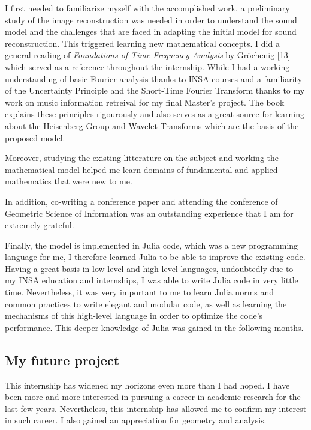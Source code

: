 \documentclass[american,]{article}
\theoremstyle{definition}
\theoremstyle{definition}
\theoremstyle{definition}
\theoremstyle{remark}
\begin{document}
I first needed to familiarize myself with the accomplished work,
a preliminary study of the image reconstruction was needed
in order to understand the sound model and the challenges that are
faced in adapting the initial model for sound reconstruction.
This triggered learning new mathematical concepts.
I did a general reading of \emph{Foundations of Time-Frequency Analysis} by Gröchenig {[}\protect\hyperlink{ref-grochenig2001}{13}{]}
which served as a reference throughout the internship.
While I had a working understanding of basic Fourier analysis thanks to INSA courses
and a familiarity of the Uncertainty Principle and the Short-Time Fourier Transform
thanks to my work on music information retreival for my final Master's project.
The book explains these principles rigourously and also serves as a great source
for learning about the Heisenberg Group and Wavelet Transforms which are the basis
of the proposed model.

Moreover, studying the existing litterature on the subject and working
the mathematical model helped me learn domains
of fundamental and applied mathematics that were new to me.

In addition, co-writing a conference paper and attending the conference
of Geometric Science of Information was an outstanding experience
that I am for extremely grateful.

Finally, the model is implemented in Julia code, which was a new programming language for me,
I therefore learned Julia to be able to improve the existing code.
Having a great basis in low-level and high-level languages,
undoubtedly due to my INSA education and internships,
I was able to write Julia code in very little time.
Nevertheless, it was very important to me to learn
Julia norms and common practices to write elegant and modular code,
as well as learning the mechanisms of this high-level language
in order to optimize the code's performance.
This deeper knowledge of Julia was gained in the following months.

\hypertarget{my-future-project}{%
\subsection{My future project}\label{my-future-project}}

This internship has widened my horizons even more than I had hoped.
I have been more and more interested in pursuing a career in academic research
for the last few years.
Nevertheless, this internship has allowed me to confirm my interest
in such career.
I also gained an appreciation for geometry and analysis.
\end{document}
